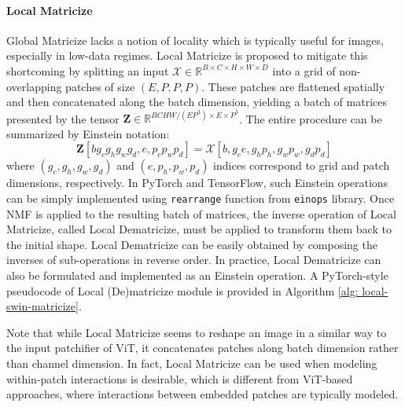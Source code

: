 \documentclass[a4,12pt]{article}
\begin{document}
	\paragraph{Local Matricize}
	Global Matricize lacks a notion of locality which is typically useful for images, especially in low-data regimes. Local Matricize is proposed to mitigate this shortcoming by splitting an input $ \bm{\mathcal{X}} \in \mathbb{R}^{B \times C \times H \times W \times D} $ into a grid of non-overlapping patches of size $ (E, P, P, P) $. These patches are flattened spatially and then concatenated along the batch dimension, yielding a batch of matrices presented by the tensor $ \mathbf{Z} \in \mathbb{R}^{BCHW/(EP^3) \times E \times P^3} $. The entire procedure can be summarized by Einstein notation:
	\begin{equation}
		\label{eq: local matricize}
		\mathbf{Z}[b g_c g_h g_w g_d, e, p_e p_w p_d] = \bm{\mathcal{X}}[b, g_c e, g_h p_h, g_w p_w, g_d p_d]
	\end{equation}
	where $ (g_c, g_h, g_w, g_d) $ and  $ (e, p_h, p_w, p_d) $ indices correspond to grid and patch dimensions, respectively. In PyTorch and TensorFlow, such Einstein operations can be simply implemented using \texttt{rearrange} function from \texttt{einops} library. Once NMF is applied to the resulting batch of matrices, the inverse operation of Local Matricize, called Local Dematricize, must be applied to transform them back to the initial shape. Local Dematricize can be easily obtained by composing the inverses of sub-operations in reverse order. In practice, Local Dematricize can also be formulated and implemented as an Einstein operation. A PyTorch-style pseudocode of Local (De)matricize module is provided in Algorithm \ref{alg: local-swin-matricize}.
	
	Note that while Local Matricize seems to reshape an image in a similar way to the input patchifier of ViT, it concatenates patches along batch dimension rather than channel dimension. In fact, Local Matricize can be used when modeling within-patch interactions is desirable, which is different from ViT-based approaches, where interactions between embedded patches are typically modeled. 
	
	
\end{document}
